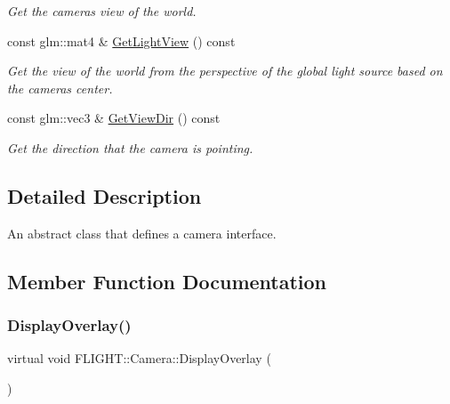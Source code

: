 \begin{DoxyCompactItemize}
\begin{DoxyCompactList}\small\item\em Get the camera\textquotesingle{}s view of the world. \end{DoxyCompactList}\item 
const glm\+::mat4 \& \hyperlink{class_f_l_i_g_h_t_1_1_camera_a02fc66e5e6430b3471009c1b74f087b8}{Get\+Light\+View} () const
\begin{DoxyCompactList}\small\item\em Get the view of the world from the perspective of the global light source based on the camera\textquotesingle{}s center. \end{DoxyCompactList}\item 
const glm\+::vec3 \& \hyperlink{class_f_l_i_g_h_t_1_1_camera_a83bfd99949fecdcd0a52e2f05290fa57}{Get\+View\+Dir} () const
\begin{DoxyCompactList}\small\item\em Get the direction that the camera is pointing. \end{DoxyCompactList}\end{DoxyCompactItemize}


\subsection{Detailed Description}
An abstract class that defines a camera interface. 

\subsection{Member Function Documentation}
\mbox{\label{class_f_l_i_g_h_t_1_1_camera_a6f89b703cf9e2e94ab9c33a4200e0a10}} 
\subsubsection{\texorpdfstring{Display\+Overlay()}{DisplayOverlay()}}
{\footnotesize\ttfamily virtual void F\+L\+I\+G\+H\+T\+::\+Camera\+::\+Display\+Overlay (\begin{DoxyParamCaption}{ }\end{DoxyParamCaption})\hspace{0.3cm}{\ttfamily [pure virtual]}}



